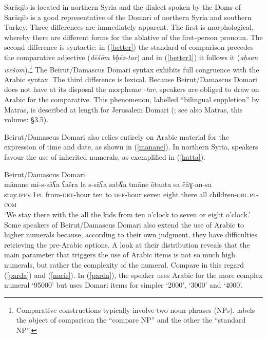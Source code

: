 \documentclass[output=paper]{langsci/langscibook}
\begin{document}
Sarāqib is located in northern Syria and the dialect spoken by the Doms of Sarāqib is a good representative of the Domari of northern Syria and southern Turkey. Three differences are immediately apparent. The first is morphological, whereby there are different forms for the ablative of the first-person pronoun. The second difference is syntactic: in (\ref{better}) the standard of comparison precedes the comparative adjective (\textit{dēšōm} \textit{bḫēz-tar}) and in (\ref{better1}) it follows it (\textit{aḥsan} \textit{wēšōm}).\footnote{Comparative constructions typically involve two noun phrases (NPs). \citet{Stassen2013} labels the object of comparison the “compare NP” and the other the “standard NP”.} The Beirut/Damascus Domari syntax exhibits full congruence with the Arabic syntax. The third difference is lexical. Because Beirut/Damascus Domari does not have at its disposal the morpheme \textit{{}-tar}, speakers are obliged to draw on Arabic for the comparative. This phenomenon, labelled ``bilingual suppletion'' by Matras, is described at length for Jerusalem Domari (\citealt[379--382]{Matras2012}; see also Matras, this volume: §3.5).

Beirut/Damascus Domari also relies entirely on Arabic material for the expression of time and date, as shown in (\ref{manane}). In northern Syria, speakers favour the use of inherited numerals, as exemplified in (\ref{hatta}).

\ea\label{ex:key:}
{Beirut/Damascus Domari}\\ \label{manane}
\gll mānane mi-s-sāʕa ʕašra la s-sāʕa sabʕa tmāne ōtanta sa čāɣ-an-sa\\
     stay.\textsc{ipfv.1pl} from-\textsc{det}{}-hour ten to \textsc{def}{}-hour seven eight there all children-\textsc{obl.pl-com}\\
   \glt ‘We stay there with the all the kids from ten o'clock to seven or eight o'clock.’\\
\z
{}
Some speakers of Beirut/Damascus Domari also extend the use of Arabic to higher numerals because, according to their own judgment, they have difficulties retrieving the pre-Arabic options. A look at their distribution reveals that the main parameter that triggers the use of Arabic items is not so much high numerals, but rather the complexity of the numeral. Compare in this regard (\ref{parda}) and (\ref{nacis}). In (\ref{parda}), the speaker uses Arabic for the more complex numeral ‘95000’ but uses Domari items for simpler `2000', `3000' and `4000'.
\end{document}
